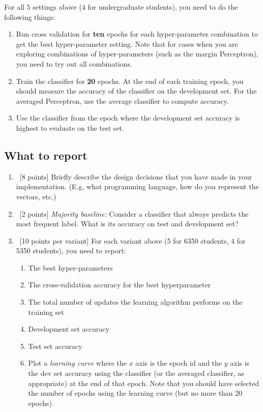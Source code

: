 For all $5$ settings above ($4$ for undergraduate students), you need to do the following things:

\begin{enumerate}
\item Run cross validation for {\bf ten} epochs for each
  hyper-parameter combination to get the best hyper-parameter
  setting. Note that for cases when you are exploring combinations of
  hyper-parameters (such as the margin Perceptron), you need to try
  out all combinations.

\item Train the classifier for {\bf 20} epochs. At the end of each
  training epoch, you should measure the accuracy of the classifier on
  the development set. For the averaged Perceptron, use the average
  classifier to compute accuracy.

\item Use the classifier from the epoch where the development set
  accuracy is highest to evaluate on the test set.
\end{enumerate}

\subsection{What to report}

\begin{enumerate}
\item~[8 points] Briefly describe the design decisions that you have
  made in your implementation. (E.g, what programming language, how do
  you represent the vectors, etc.)
\item~[2 points] {\em Majority baseline:} Consider a classifier that
  always predicts the most frequent label. What is its accuracy on
  test and development set?
\item~[10 points per variant] For each variant above (5 for 6350 students, 4 for 5350 students), you need to report:
  \begin{enumerate}
  \item The best hyper-parameters
  \item The cross-validation accuracy for the best hyperparameter 
  \item The total number of updates the learning algorithm performs on the training set
  \item Development set accuracy
  \item Test set accuracy
  \item Plot a {\em learning curve} where the $x$ axis is the epoch id
    and the $y$ axis is the dev set accuracy using the classifier (or
    the averaged classifier, as appropriate) at the end of that
    epoch. Note that you should have selected the number of epochs
    using the learning curve (but no more than 20 epochs).
  \end{enumerate}
\end{enumerate}

